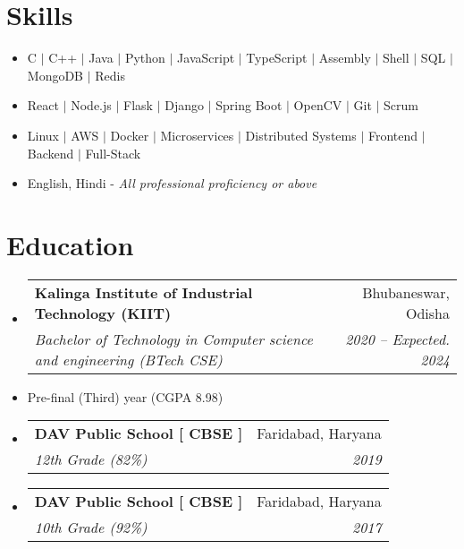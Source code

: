 \documentclass[letterpaper,11pt]{article}
\makeatletter
\newcommand{\resumeItem}[1]{
  \item\small{
    {#1 \vspace{-2pt}}
  }
}
\newcommand{\resumeSubheading}[4]{
  \vspace{-2pt}\item
    \begin{tabular*}{0.97\textwidth}[t]{l@{\extracolsep{\fill}}r}
      \textbf{#1} & #2 \\
      \textit{\small#3} & \textit{\small #4} \\
    \end{tabular*}\vspace{-7pt}
}
\newcommand{\resumeSubHeadingListStart}{\begin{itemize}[leftmargin=0.15in, label={}]}
\newcommand{\resumeSubHeadingListEnd}{\end{itemize}}
\newcommand{\resumeItemListStart}{\begin{itemize}}
\newcommand{\resumeItemListEnd}{\end{itemize}\vspace{-5pt}}
\makeatother
\begin{document}
%
\section{Skills}
    \begin{itemize}[leftmargin=0.15in, label={}]
        \small{\item{
            \resumeItemListStart
                \resumeItem{ C $|$ C++ $|$ Java $|$ Python $|$ JavaScript $|$ TypeScript $|$ Assembly $|$ Shell $|$ SQL $|$ MongoDB $|$ Redis}
                \resumeItem{ React $|$ Node.js $|$ Flask $|$ Django $|$ Spring Boot $|$ OpenCV $|$ Git $|$ Scrum}
                \resumeItem{ Linux $|$ AWS $|$ Docker $|$ Microservices $|$ Distributed Systems $|$ Frontend $|$ Backend $|$ Full-Stack}
                \resumeItem{ English, Hindi - \textit{All professional proficiency or above}}
            \resumeItemListEnd
        }}
    \end{itemize}

 
\section{Education}
  \resumeSubHeadingListStart
    \resumeSubheading
      {Kalinga Institute of Industrial Technology (KIIT)}{Bhubaneswar, Odisha}
      {Bachelor of Technology in Computer science and engineering (BTech CSE)}{2020 -- Expected. 2024}
      \resumeItem{Pre-final (Third) year (CGPA 8.98)}

    \resumeSubheading
      {DAV Public School [ CBSE ]}{Faridabad, Haryana}
      {12th Grade (82\%)}{2019}

    \resumeSubheading
      {DAV Public School [ CBSE ]}{Faridabad, Haryana}
      {10th Grade (92\%)}{2017}
  \resumeSubHeadingListEnd
\end{document}
